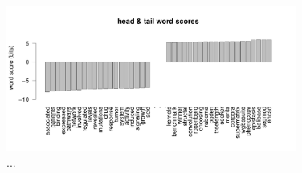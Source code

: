 \documentclass[fleqn,10pt]{SelfArx} %
\begin{document}
\begin{figure}[H]
\centering
\includegraphics[width=0.85\textwidth]{wordScores.pdf}
\caption{...}
\label{fig:S5}
\end{figure}




\end{document}
